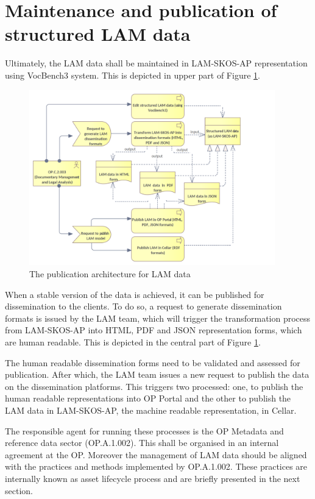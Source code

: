 	
	\section{Maintenance and publication of structured LAM data}
	
	Ultimately, the LAM data shall be maintained in LAM-SKOS-AP representation using VocBench3 system. This is depicted in upper part of Figure \ref{fig:lam2-context}.
		
	\begin{figure}[!h]
		\centering
		\includegraphics[width=0.95\textwidth]{images/business/context/LAM2 context.png}
		\caption{The publication architecture for LAM data}
		\label{fig:lam2-context}
	\end{figure} 
	
	When a stable version of the data is achieved, it can be published for dissemination to the clients. To do so, a request to generate dissemination formats is issued by the LAM team, which will trigger the transformation process from LAM-SKOS-AP into HTML, PDF and JSON representation forms, which are human readable. This is depicted in the central part of Figure \ref{fig:lam2-context}. 
	
	The human readable dissemination forms need to be validated and assessed for publication. After which, the LAM team issues a new request to publish the data on the dissemination platforms. This triggers two processed: one, to publish the human readable representations into OP Portal and the other to publish the LAM data in LAM-SKOS-AP, the machine readable representation, in Cellar. 
	
	The responsible agent for running these processes is the OP Metadata and reference data sector (OP.A.1.002). This shall be organised in an internal agreement at the OP. Moreover the management of LAM data should be aligned with the practices and methods implemented by OP.A.1.002. These practices are internally known as asset lifecycle process and are briefly presented in the next section. 
	
